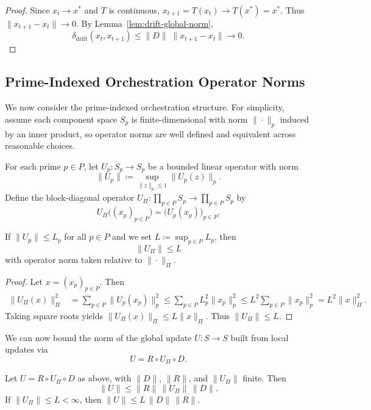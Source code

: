 \documentclass[11pt]{article}
\begin{document}
\begin{proof}
Since \(x_t \to x^\ast\) and \(T\) is continuous, \(x_{t+1} = T(x_t) \to T(x^\ast) = x^\ast\).%
Thus \(\|x_{t+1} - x_t\| \to 0\).%
By Lemma~\ref{lem:drift-global-norm},
\[
  \delta_{\mathrm{drift}}(x_t, x_{t+1})
  \le
  \|D\|\;\|x_{t+1} - x_t\| \to 0.
\]
\end{proof}

\subsection{Prime-Indexed Orchestration Operator Norms}

We now consider the prime-indexed orchestration structure.%
For simplicity, assume each component space \(S_p\) is finite-dimensional with norm \(\|\cdot\|_p\) induced by an inner product, so operator norms are well defined and equivalent across reasonable choices.

\begin{definition}
For each prime \(p \in P\), let \(U_p : S_p \to S_p\) be a bounded linear operator with norm
\[
  \|U_p\| \coloneqq \sup_{\|z\|_p \le 1} \|U_p(z)\|_p.
\]
Define the block-diagonal operator \(U_{\Pi} : \prod_{p \in P} S_p \to \prod_{p \in P} S_p\) by
\[
  U_{\Pi}\bigl((x_p)_{p \in P}\bigr) = \bigl(U_p(x_p)\bigr)_{p \in P}.
\]
\end{definition}

\begin{lemma}
\label{lem:block-diagonal}
If \(\|U_p\| \le L_p\) for all \(p \in P\) and we set \(L \coloneqq \sup_{p \in P} L_p\), then
\[
  \|U_{\Pi}\| \le L
\]
with operator norm taken relative to \(\|\cdot\|_{\Pi}\).
\end{lemma}

\begin{proof}
Let \(x = (x_p)_{p \in P}\). Then
\begin{align*}
  \|U_{\Pi}(x)\|_{\Pi}^2
  &= \sum_{p \in P} \|U_p(x_p)\|_p^2
  \le \sum_{p \in P} L_p^2 \|x_p\|_p^2
  \le L^2 \sum_{p \in P} \|x_p\|_p^2
  = L^2 \|x\|_{\Pi}^2.
\end{align*}
Taking square roots yields \(\|U_{\Pi}(x)\|_{\Pi} \le L \|x\|_{\Pi}\).%
Thus \(\|U_{\Pi}\| \le L\).
\end{proof}

We can now bound the norm of the global update \(U : S \to S\) built from local updates via
\[
  U = R \circ U_{\Pi} \circ D.
\]

\begin{proposition}
\label{prop:global-norm}
Let \(U = R \circ U_{\Pi} \circ D\) as above, with \(\|D\|\), \(\|R\|\), and \(\|U_{\Pi}\|\) finite. Then
\[
  \|U\| \le \|R\|\,\|U_{\Pi}\|\,\|D\|.
\]
If \(\|U_{\Pi}\| \le L < \infty\), then \(\|U\| \le L\,\|D\|\,\|R\|\).
\end{proposition}
\end{document}
